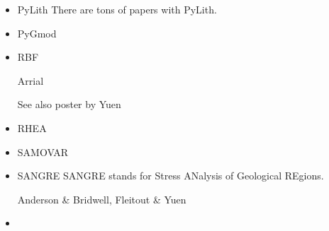\begin{itemize}
\item PyLith 
There are tons of papers with PyLith. 

{\small
\noindent
\cite{aakw13}
}

\item PyGmod 

{\small
\noindent
\cite{crvs15}
}

\item {\codefont RBF} 

Arrial \etal \cite{arfw14}

See also poster by Yuen


\item RHEA 

{\small
\noindent
\cite{bugg08}
\cite{stgb10}
\cite{algs12}
\cite{busa13}
}

\item SAMOVAR

{\small
\noindent
\cite{egat10}
}


\item {\codefont SANGRE} 
SANGRE stands for Stress ANalysis of Geological REgions.

\begin{scriptsize}
Anderson \& Bridwell\cite{anbr80},
Fleitout \& Yuen \cite{flyu84,flyu84b}
\end{scriptsize}

\item \sepran 
{}


\end{itemize}
